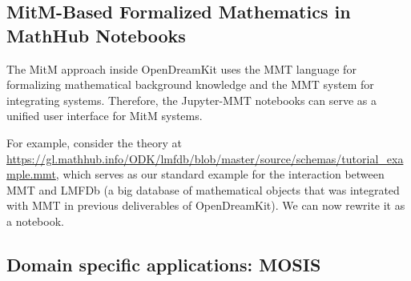 \subsection{MitM-Based Formalized Mathematics in MathHub Notebooks}

The MitM approach inside OpenDreamKit uses the MMT language for formalizing mathematical background knowledge and the MMT system for integrating systems.
Therefore, the Jupyter-MMT notebooks can serve as a unified user interface for MitM systems.

For example, consider the theory at \url{https://gl.mathhub.info/ODK/lmfdb/blob/master/source/schemas/tutorial_example.mmt}, which serves as our standard example for the interaction between MMT and LMFDb (a big database of mathematical objects that was integrated with MMT in previous deliverables of OpenDreamKit).
We can now rewrite it as a notebook.

\subsection{Domain specific applications: MOSIS}


